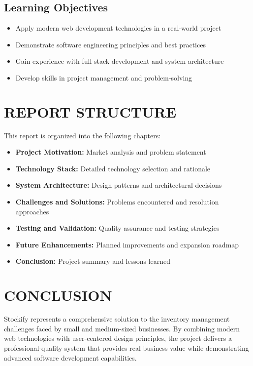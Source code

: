 \subsection{Learning Objectives}
\begin{itemize}
\item Apply modern web development technologies in a real-world project
\item Demonstrate software engineering principles and best practices
\item Gain experience with full-stack development and system architecture
\item Develop skills in project management and problem-solving
\end{itemize}

\section{REPORT STRUCTURE}

This report is organized into the following chapters:
\begin{itemize}
\item \textbf{Project Motivation:} Market analysis and problem statement
\item \textbf{Technology Stack:} Detailed technology selection and rationale
\item \textbf{System Architecture:} Design patterns and architectural decisions
\item \textbf{Challenges and Solutions:} Problems encountered and resolution approaches
\item \textbf{Testing and Validation:} Quality assurance and testing strategies
\item \textbf{Future Enhancements:} Planned improvements and expansion roadmap
\item \textbf{Conclusion:} Project summary and lessons learned
\end{itemize}

\section{CONCLUSION}

Stockify represents a comprehensive solution to the inventory management challenges faced by small and medium-sized businesses. By combining modern web technologies with user-centered design principles, the project delivers a professional-quality system that provides real business value while demonstrating advanced software development capabilities.